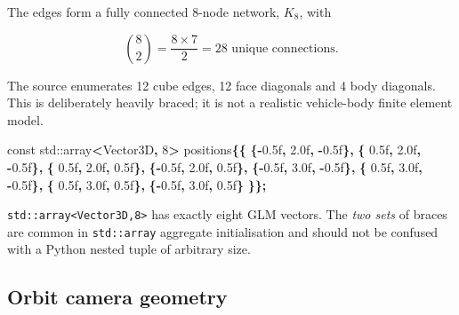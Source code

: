 \documentclass[
  10pt,
  a4paper,
]{article}
\newenvironment{Shaded}{\begin{snugshade}}{\end{snugshade}}
\newcommand{\AttributeTok}[1]{\textcolor[rgb]{0.13,0.29,0.53}{#1}}
\newcommand{\BuiltInTok}[1]{#1}
\newcommand{\DecValTok}[1]{\textcolor[rgb]{0.00,0.00,0.81}{#1}}
\newcommand{\FloatTok}[1]{\textcolor[rgb]{0.00,0.00,0.81}{#1}}
\newcommand{\NormalTok}[1]{#1}
\newcommand{\OperatorTok}[1]{\textcolor[rgb]{0.81,0.36,0.00}{\textbf{#1}}}
\begin{document}
The edges form a fully connected 8-node network, \(K_8\), with

\[\binom{8}{2}=\frac{8\times7}{2}=28\text{ unique connections}.\]

The source enumerates 12 cube edges, 12 face diagonals and 4 body
diagonals. This is deliberately heavily braced; it is not a realistic
vehicle-body finite element model.

\begin{Shaded}
\begin{Highlighting}[]
\AttributeTok{const} \BuiltInTok{std::}\NormalTok{array}\OperatorTok{\textless{}}\NormalTok{Vector3D}\OperatorTok{,} \DecValTok{8}\OperatorTok{\textgreater{}}\NormalTok{ positions}\OperatorTok{\{\{}
    \OperatorTok{\{{-}}\FloatTok{0.5}\BuiltInTok{f}\OperatorTok{,} \FloatTok{2.0}\BuiltInTok{f}\OperatorTok{,} \OperatorTok{{-}}\FloatTok{0.5}\BuiltInTok{f}\OperatorTok{\},}
    \OperatorTok{\{} \FloatTok{0.5}\BuiltInTok{f}\OperatorTok{,} \FloatTok{2.0}\BuiltInTok{f}\OperatorTok{,} \OperatorTok{{-}}\FloatTok{0.5}\BuiltInTok{f}\OperatorTok{\},}
    \OperatorTok{\{} \FloatTok{0.5}\BuiltInTok{f}\OperatorTok{,} \FloatTok{2.0}\BuiltInTok{f}\OperatorTok{,}  \FloatTok{0.5}\BuiltInTok{f}\OperatorTok{\},}
    \OperatorTok{\{{-}}\FloatTok{0.5}\BuiltInTok{f}\OperatorTok{,} \FloatTok{2.0}\BuiltInTok{f}\OperatorTok{,}  \FloatTok{0.5}\BuiltInTok{f}\OperatorTok{\},}
    \OperatorTok{\{{-}}\FloatTok{0.5}\BuiltInTok{f}\OperatorTok{,} \FloatTok{3.0}\BuiltInTok{f}\OperatorTok{,} \OperatorTok{{-}}\FloatTok{0.5}\BuiltInTok{f}\OperatorTok{\},}
    \OperatorTok{\{} \FloatTok{0.5}\BuiltInTok{f}\OperatorTok{,} \FloatTok{3.0}\BuiltInTok{f}\OperatorTok{,} \OperatorTok{{-}}\FloatTok{0.5}\BuiltInTok{f}\OperatorTok{\},}
    \OperatorTok{\{} \FloatTok{0.5}\BuiltInTok{f}\OperatorTok{,} \FloatTok{3.0}\BuiltInTok{f}\OperatorTok{,}  \FloatTok{0.5}\BuiltInTok{f}\OperatorTok{\},}
    \OperatorTok{\{{-}}\FloatTok{0.5}\BuiltInTok{f}\OperatorTok{,} \FloatTok{3.0}\BuiltInTok{f}\OperatorTok{,}  \FloatTok{0.5}\BuiltInTok{f}\OperatorTok{\}}
\OperatorTok{\}\};}
\end{Highlighting}
\end{Shaded}

\texttt{std::array\textless{}Vector3D,8\textgreater{}} has exactly eight
GLM vectors. The \emph{two sets} of braces are common in
\texttt{std::array} aggregate initialisation and should not be confused
with a Python nested tuple of arbitrary size.

\subsection{Orbit camera geometry}\label{orbit-camera-geometry}
\end{document}
